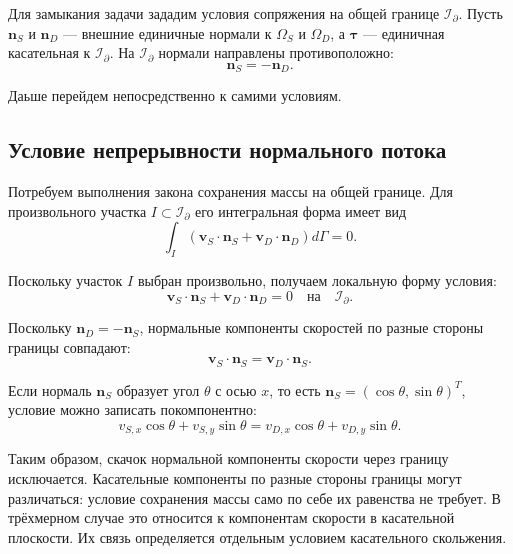\documentclass[a4paper,14pt]{extarticle}
\begin{document}
Для замыкания задачи зададим условия сопряжения на общей
границе $\mathcal I_{\partial}$. Пусть $\mathbf n_S$ и
$\mathbf n_D$ --- внешние единичные нормали к  $\Omega_S$ и $\Omega_D$, а $\boldsymbol\tau$ ---
единичная касательная к $\mathcal I_{\partial}$. На
$\mathcal I_{\partial}$ нормали направлены противоположно:
\[
	\mathbf n_S=-\mathbf n_D.
\]

Даьше перейдем непосредственно к самими условиям.

\subsection{Условие непрерывности нормального потока}
Потребуем выполнения закона сохранения массы на общей
границе. Для произвольного участка
$I\subset\mathcal I_{\partial}$ его интегральная форма
имеет вид
\begin{equation}
	\int_I
	\left(
		\mathbf v_S\cdot\mathbf n_S
		+
		\mathbf v_D\cdot\mathbf n_D
	\right)d\Gamma
	=
	0.
\end{equation}

Поскольку участок $I$ выбран произвольно, получаем
локальную форму условия:
\begin{equation}
	\mathbf v_S\cdot\mathbf n_S
	+
	\mathbf v_D\cdot\mathbf n_D
	=
	0
	\quad\text{на}\quad\mathcal I_{\partial}.
	\label{eq:normal_flux}
\end{equation}

Поскольку $\mathbf n_D=-\mathbf n_S$, нормальные компоненты
скоростей по разные стороны границы совпадают:
\begin{equation}
	\mathbf v_S\cdot\mathbf n_S
	=
	\mathbf v_D\cdot\mathbf n_S.
\end{equation}

Если нормаль $\mathbf n_S$ образует угол $\theta$ с осью $x$,
то есть $\mathbf n_S=(\cos\theta,\sin\theta)^T$, условие
можно записать покомпонентно:
\begin{equation}
	v_{S,x}\cos\theta+v_{S,y}\sin\theta
	=
	v_{D,x}\cos\theta+v_{D,y}\sin\theta.
\end{equation}

Таким образом, скачок нормальной компоненты скорости через
границу исключается. Касательные компоненты по разные
стороны границы могут различаться: условие сохранения
массы само по себе их равенства не требует. В трёхмерном
случае это относится к компонентам скорости в касательной
плоскости. Их связь определяется отдельным условием
касательного скольжения.
\end{document}
